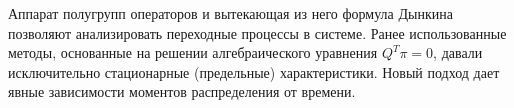 \begin{note}[2]
    Аппарат полугрупп операторов и вытекающая из него формула Дынкина позволяют анализировать переходные процессы в системе. Ранее использованные методы, основанные на решении алгебраического уравнения $Q^T \pi = 0$, давали исключительно стационарные (предельные) характеристики. Новый подход дает явные зависимости моментов распределения от времени.
\end{note}